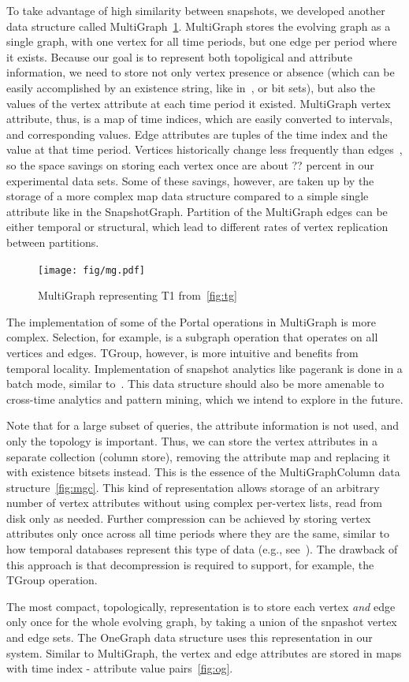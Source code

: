 To take advantage of high similarity between snapshots, we developed
another data structure called MultiGraph~\ref{fig:mg}.  MultiGraph
stores the evolving graph as a single graph, with one vertex for all
time periods, but one edge per period where it exists.  Because our
goal is to represent both topoligical and attribute information, we
need to store not only vertex presence or absence (which can be easily
accomplished by an existence string, like in~\cite{Kan2009}, or bit
sets), but also the values of the vertex attribute at each time period
it existed.  MultiGraph vertex attribute, thus, is a map of time
indices, which are easily converted to intervals, and corresponding
values.  Edge attributes are tuples of the time index and the value at
that time period.  Vertices historically change less frequently than
edges~\cite{?}, so the space savings on storing each vertex once are
about ?? percent in our experimental data sets.  Some of these
savings, however, are taken up by the storage of a more complex map
data structure compared to a simple single attribute like in the
SnapshotGraph.  Partition of the MultiGraph edges can be either
temporal or structural, which lead to different rates of vertex
replication between partitions.

\begin{figure}[t!]
\texttt{[image: fig/mg.pdf]}
\caption{MultiGraph representing T1 from~\ref{fig:tg}}
\label{fig:mg}
\end{figure}

The implementation of some of the Portal operations in MultiGraph is
more complex.  Selection, for example, is a subgraph operation that
operates on all vertices and edges.  TGroup, however, is more
intuitive and benefits from temporal locality.  Implementation of
snapshot analytics like pagerank is done in a batch mode, similar
to~\cite{DBLP:journals/tos/MiaoHLWYZPCC15}.  This data structure
should also be more amenable to cross-time analytics and pattern
mining, which we intend to explore in the future.

Note that for a large subset of queries, the attribute information is
not used, and only the topology is important.  Thus, we can store the
vertex attributes in a separate collection (column store), removing
the attribute map and replacing it with existence bitsets instead.
This is the essence of the MultiGraphColumn data
structure~\ref{fig:mgc}.  This kind of representation allows storage
of an arbitrary number of vertex attributes without using complex
per-vertex lists, read from disk only as needed.  Further compression
can be achieved by storing vertex attributes only once across all time
periods where they are the same, similar to how temporal databases
represent this type of data (e.g., see~\cite{Muller2008}).  The
drawback of this approach is that decompression is required to
support, for example, the TGroup operation.

The most compact, topologically, representation is to store each
vertex {\em and} edge only once for the whole evolving graph, by
taking a union of the snpashot vertex and edge sets.  The OneGraph
data structure uses this representation in our system.  Similar to
MultiGraph, the vertex and edge attributes are stored in maps with
time index - attribute value pairs~\ref{fig:og}.  
